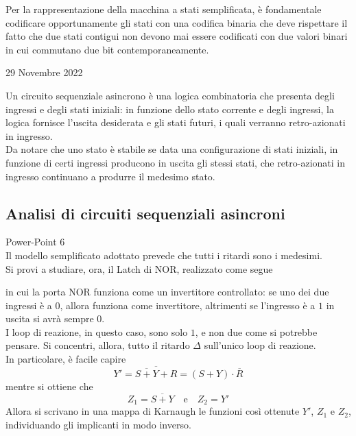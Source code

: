 \documentclass[a4paper]{extarticle}
\begin{document}
\vspace{1em}
\noindent
Per la rappresentazione della macchina a stati semplificata, è fondamentale codificare opportunamente gli stati con una codifica binaria che deve rispettare il fatto che due stati contigui non devono mai essere codificati con due valori binari in cui commutano due bit contemporaneamente.

\newpage
\begin{center}
    29 Novembre 2022
\end{center}
Un circuito sequenziale asincrono è una logica combinatoria che presenta degli ingressi e degli stati iniziali: in funzione dello stato corrente e degli ingressi, la logica fornisce l'uscita desiderata e gli stati futuri, i quali verranno retro-azionati in ingresso.\\
Da notare che uno stato è stabile se data una configurazione di stati iniziali, in funzione di certi ingressi producono in uscita gli stessi stati, che retro-azionati in ingresso continuano a produrre il medesimo stato.

\vspace{1em}
\noindent
\subsection{Analisi di circuiti sequenziali asincroni}
Power-Point 6\\
Il modello semplificato adottato prevede che tutti i ritardi sono i medesimi.\\
Si provi a studiare, ora, il Latch di NOR, realizzato come segue


\vspace{1em}
\noindent
in cui la porta NOR funziona come un invertitore controllato: se uno dei due ingressi è a $0$, allora funziona come invertitore, altrimenti se l'ingresso è a $1$ in uscita si avrà sempre $0$.\\
I loop di reazione, in questo caso, sono solo $1$, e non due come si potrebbe pensare. Si concentri, allora, tutto il ritardo $\Delta$ sull'unico loop di reazione.\\
In particolare, è facile capire
\[Y'=\overline{\overline{S+Y}+R} = (S+Y) \cdot \overline{R}\]
mentre si ottiene che
\[Z_1=\overline{S+Y} \hspace{1em} \text{e} \hspace{1em} Z_2=Y'\]
Allora si scrivano in una mappa di Karnaugh le funzioni così ottenute $Y'$, $Z_1$ e $Z_2$, individuando gli implicanti in modo inverso.
\end{document}
